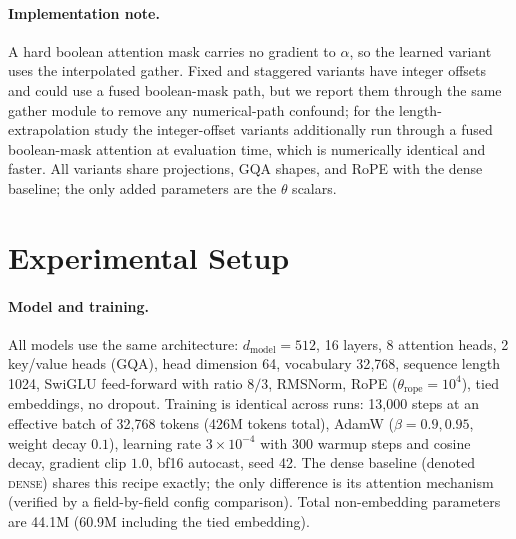 \documentclass[11pt]{article}
\begin{document}
\paragraph{Implementation note.}
A hard boolean attention mask carries no gradient to $\alpha$, so the learned
variant uses the interpolated gather. Fixed and staggered variants have integer
offsets and could use a fused boolean-mask path, but we report them through the
same gather module to remove any numerical-path confound; for the
length-extrapolation study the integer-offset variants additionally run through a
fused boolean-mask attention at evaluation time, which is numerically identical
and faster. All variants share projections, GQA shapes, and RoPE with the dense
baseline; the only added parameters are the $\theta$ scalars.

\section{Experimental Setup}
\label{sec:setup}

\paragraph{Model and training.}
All models use the same architecture: $d_{\text{model}}=512$, 16 layers, 8
attention heads, 2 key/value heads (GQA), head dimension 64, vocabulary 32{,}768,
sequence length 1024, SwiGLU feed-forward with ratio $8/3$, RMSNorm, RoPE
($\theta_{\text{rope}}=10^4$), tied embeddings, no dropout. Training is identical
across runs: 13{,}000 steps at an effective batch of 32{,}768 tokens
(426M tokens total), AdamW ($\beta=0.9,0.95$, weight decay $0.1$), learning rate
$3\times10^{-4}$ with 300 warmup steps and cosine decay, gradient clip $1.0$,
bf16 autocast, seed 42. The dense baseline (denoted \textsc{dense}) shares this
recipe exactly; the only difference is its attention mechanism (verified by a
field-by-field config comparison). Total non-embedding parameters are 44.1M
(60.9M including the tied embedding).
\end{document}
